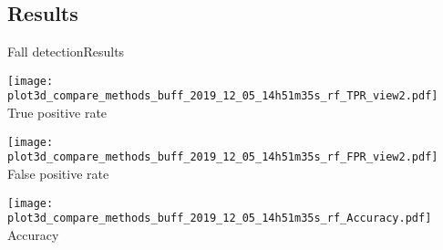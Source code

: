 \subsection{Results}
\begin{frame}{Fall detection}{Results}
    \renewcommand{\ratio}{0.32}
    \centering
    \begin{minipage}[t]{0.9\linewidth}
        \centering
        \begin{minipage}[t]{\ratio\linewidth}
            \centering
            \texttt{[image: plot3d\_compare\_methods\_buff\_2019\_12\_05\_14h51m35s\_rf\_TPR\_view2.pdf]}\\
            \smallskip
            {\small True positive rate}
        \end{minipage}
        \begin{minipage}[t]{\ratio\linewidth}
            \centering
            \texttt{[image: plot3d\_compare\_methods\_buff\_2019\_12\_05\_14h51m35s\_rf\_FPR\_view2.pdf]}\\
            \smallskip
            {\small False positive rate}
        \end{minipage}
        \begin{minipage}[t]{\ratio\linewidth}
            \centering
            \texttt{[image: plot3d\_compare\_methods\_buff\_2019\_12\_05\_14h51m35s\_rf\_Accuracy.pdf]}\\
            \smallskip
            {\small Accuracy}
        \end{minipage}
    \end{minipage}

\medskip


\end{frame}

